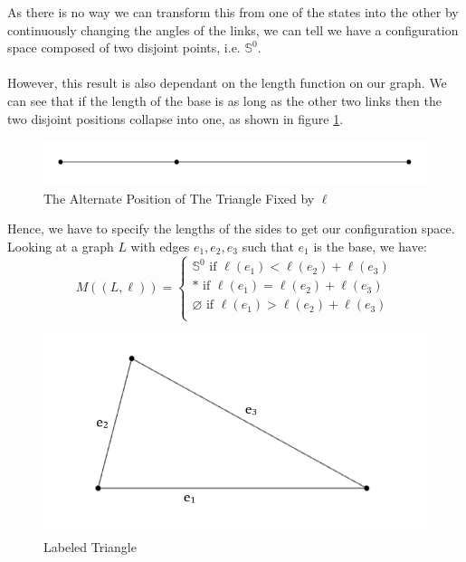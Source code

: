 \documentclass{article}
\begin{document}
\noindent As there is no way we can transform this from one of the states into the other by continuously changing the angles of the links, we can tell we have a configuration space composed of two disjoint points, i.e. $\mathbb S^0$. \\\\ However, this result is also dependant on the length function on our graph. We can see that if the length of the base is as long as the other two links then the two disjoint positions collapse into one, as shown in figure \ref{fig:The Alternate Position of The Triangle Fixed}.

\begin{figure}[h!]
\centering
\includegraphics[scale=0.5]{./images/triangle_alt_switch_fixed}
\caption{The Alternate Position of The Triangle Fixed by $\ell$}
\label{fig:The Alternate Position of The Triangle Fixed}
\end{figure}

\noindent Hence, we have to specify the lengths of the sides to get our configuration space. Looking at a graph $L$ with edges $e_1,e_2,e_3$ such that $e_1$ is the base, we have:
$$
M((L,\ell)) = 
\begin{cases}
\mathbb S^0 \text{ if } \ell(e_1) < \ell(e_2) + \ell(e_3) \\
\mathbb * \text{ if } \ell(e_1) = \ell(e_2) + \ell(e_3) \\
\mathbb \varnothing \text{ if } \ell(e_1) > \ell(e_2) + \ell(e_3) \\
\end{cases}
$$

\begin{figure}[h!]
\centering
\includegraphics[scale=0.5]{./images/triangle_labeled.png}
\caption{Labeled Triangle}
\label{fig:Triangle Labeled}
\end{figure}
\end{document}
